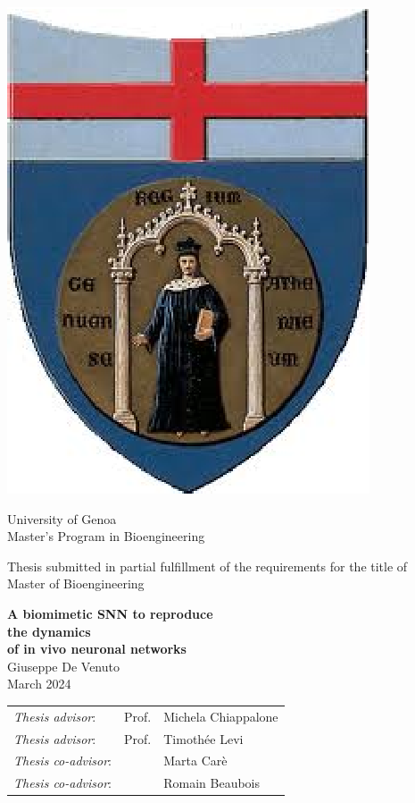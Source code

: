 
\thispagestyle{empty}

\begin{center}
	\includegraphics[width=0.2\linewidth]{Figure/unige.eps}
\end{center}
	
	\begin{center} 
		\LARGE\sc
		University of Genoa\\
		
		\vspace{0.5cm}
		\large
		Master's Program in Bioengineering\\
	\end{center}
	
	\begin{center} 
		\small
		Thesis submitted in partial fulfillment of the requirements for the title of \\
		Master of Bioengineering\\
	\end{center}

	\vfill
	
	\begin{center} 
		\LARGE
		{\bf {A biomimetic SNN to reproduce\\ the dynamics \\of in vivo neuronal networks}}\\
		\vspace{0.5cm}
		\large
		Giuseppe De Venuto\\
		\vspace{0.5cm}
		\small
		March 2024
	\end{center}

	\vfill
	
	\begin{tabular}{lll}%
	{\em Thesis advisor}:	& Prof.	& Michela Chiappalone\\
	{\em Thesis advisor}:	& Prof.	& Timothée Levi\\
	{\em Thesis co-advisor}:	&  & Marta Carè\\
	{\em Thesis co-advisor}:	&  & Romain Beaubois\\
	\end{tabular} 

\hfill


